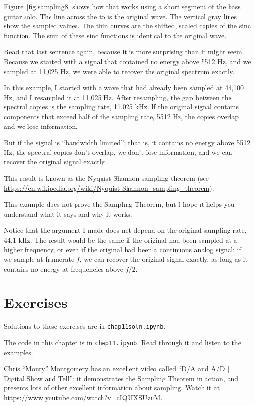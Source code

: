 \documentclass[12pt]{book}
\begin{document}
Figure~\ref{fig.sampling8} shows how that works using a short segment
of the bass guitar solo.  The line across the to is the original
wave.  The vertical gray lines show the sampled values.  The thin
curves are the shifted, scaled copies of the sinc function.
The sum of these sinc functions is identical to the original wave.

Read that last sentence again, because it is more surprising than it
might seem.  Because we started with a signal that contained no energy
above 5512 Hz, and we sampled at 11,025 Hz, we were able to recover
the original spectrum exactly.

In this example, I started with a wave that had already been
sampled at 44,100 Hz, and I resampled it at 11,025 Hz.  After
resampling, the gap between the spectral copies is the sampling
rate, 11.025 kHz.  If the original signal contains components that
exceed half of the sampling rate, 5512 Hz, the copies overlap
and we lose information.

But if the signal is ``bandwidth limited''; that is, it contains no
energy above 5512 Hz, the spectral copies don't overlap, we don't lose
information, and we can recover the original signal exactly.

This result is known as the Nyquist-Shannon sampling theorem (see 
\url{https://en.wikipedia.org/wiki/Nyquist-Shannon_sampling_theorem}).

This example does not prove the Sampling Theorem, but I hope it
helps you understand what it says and why it works.

Notice that the argument I made does
not depend on the original sampling rate, 44.1 kHz.  The result
would be the same if the original had been sampled at a higher
frequency, or even if the original had been a continuous analog
signal: if we sample at framerate $f$, we can recover the original
signal exactly, as long as it contains no energy at frequencies
above $f/2$.  


\section{Exercises}

Solutions to these exercises are in {\tt chap11soln.ipynb}.

\begin{exercise}
The code in this chapter is in {\tt chap11.ipynb}.  Read through
it and listen to the examples.
\end{exercise}


\begin{exercise}
Chris ``Monty'' Montgomery has an excellent video called ``D/A and A/D
| Digital Show and Tell''; it demonstrates the Sampling Theorem in
action, and presents lots of other excellent information about
sampling.  Watch it at
\url{https://www.youtube.com/watch?v=cIQ9IXSUzuM}.
\end{exercise}


\begin{exercise}
\end{exercise}
\end{document}
